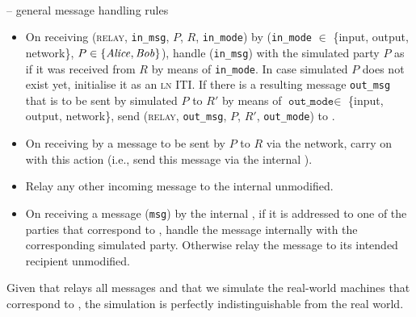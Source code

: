 \ \\
\begin{center}
  \begin{simulatorbox}{\simulator{} -- general message handling rules}
    \begin{itemize}
      \item On receiving (\textsc{relay}, \texttt{in\_msg}, $P$, $R$,
      \texttt{in\_mode}) by \fchan (\texttt{in\_mode} $\in$ \{input, output,
      network\}, $P \in \{\mathit{Alice}, \mathit{Bob}\}$), handle (\texttt{in\_msg}) with the
      simulated party $P$ as if it was received from $R$ by means of
      \texttt{in\_mode}. In case simulated $P$ does not exist yet, initialise it
      as an \textsc{ln} ITI. If there is a resulting message \texttt{out\_msg}
      that is to be sent by simulated $P$ to $R'$ by means of
      $\texttt{out\_mode} \in$ \{input, output, network\}, send (\textsc{relay},
      \texttt{out\_msg}, $P$, $R'$, \texttt{out\_mode}) to \fchan.
      \item On receiving by \fchan a message to be sent by $P$ to $R$ via the
      network, carry on with this action (i.e., send this message via the
      internal \adversary).
      \item Relay any other incoming message to the internal \adversary
      unmodified.
      \item On receiving a message (\texttt{msg}) by the internal \adversary, if it is
      addressed to one of the parties that correspond to \fchan, handle the
      message internally with the corresponding simulated party. Otherwise relay
      the message to its intended recipient unmodified. 
    \end{itemize}

    Given that \fchan relays all messages and that we simulate the real-world
    machines that correspond to \fchan, the simulation is perfectly
    indistinguishable from the real world.
  \end{simulatorbox}
  \label{code:simulator:flow}
\end{center} \ \\

